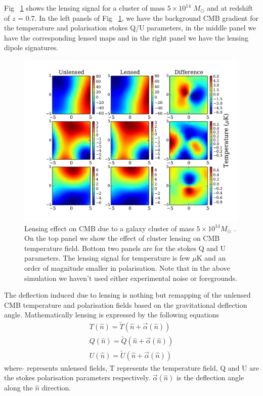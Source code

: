 Fig ~\ref{fig:lensing_signal} shows the lensing signal for a cluster of mass $5 \times 10^{14}$ $M_{\odot}$ and at redshift of $z$ = 0.7.
In  the left panels of Fig ~\ref{fig:lensing_signal}, we have the background CMB gradient for the temperature and polarisation stokes Q/U parameters, in the middle panel we have the corresponding lensed maps and in the right panel we have the lensing dipole signatures.
\begin{figure}[ht]
\begin{center}
\includegraphics[width=\linewidth, keepaspectratio]{figs/lensing_signal.pdf}
 \caption{Lensing effect on CMB due to a galaxy cluster of mass $5\times 10^{14} M_{\odot}$ .
  On the top panel we show the effect of cluster lensing on CMB temperature field.
  Bottom two panels are for the stokes Q and U parameters.
  The lensing signal for temperature is few $\mu$K and an order of magnitude smaller in polarisation.
  Note that in the above simulation we haven't used either experimental noise or foregrounds. 
 } 
\label{fig:lensing_signal}
\end{center}
\end{figure}

The deflection induced due to lensing is nothing but remapping of the unlensed CMB temperature and polarisation fields based on the gravitational deflection angle. Mathematically lensing is expressed by the following equations
\begin{eqnarray}
T(\hat{n}) = \widetilde{T}(\hat{n} + \vec{\alpha}(\hat{n}))\\
Q(\hat{n}) = \widetilde{Q}(\hat{n} + \vec{\alpha}(\hat{n}))\\
U(\hat{n}) =  \widetilde{U}(\hat{n} + \vec{\alpha}(\hat{n}))
\end{eqnarray}
where $\widetilde{}$ represents unlensed fields, T represents the temperature field, Q and U are the stokes polarisation parameters respectively. 
$\vec{\alpha}(\hat{n})$ is the deflection angle along the $\hat{n}$ direction. 
\\

